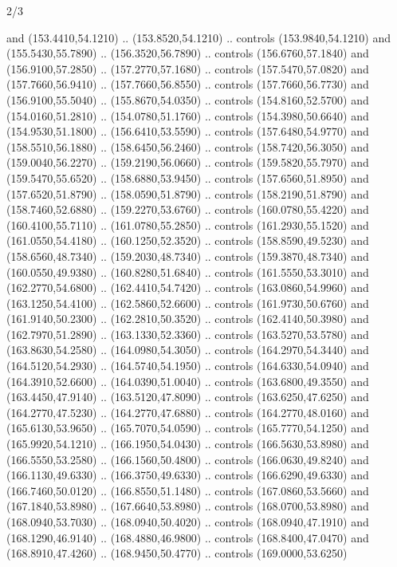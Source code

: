 \begin{flagdescription}{2/3}
\begin{scope}[xshift=0.5\flaglength,yshift=0.5\flagwidth,scale=\stretchfactor]
\begin{scope}[scale=0.001645\flagwidth,yshift=65mm,xshift=-63mm]
\begin{scope}[y=0.80pt, x=0.80pt, yscale=-1,]
\begin{scope}[cm={{1.33333,0.0,0.0,1.33333,(0.0,1e-05)}}]
  and (153.4410,54.1210) .. (153.8520,54.1210) .. controls (153.9840,54.1210)
  and (155.5430,55.7890) .. (156.3520,56.7890) .. controls (156.6760,57.1840)
  and (156.9100,57.2850) .. (157.2770,57.1680) .. controls (157.5470,57.0820)
  and (157.7660,56.9410) .. (157.7660,56.8550) .. controls (157.7660,56.7730)
  and (156.9100,55.5040) .. (155.8670,54.0350) .. controls (154.8160,52.5700)
  and (154.0160,51.2810) .. (154.0780,51.1760) .. controls (154.3980,50.6640)
  and (154.9530,51.1800) .. (156.6410,53.5590) .. controls (157.6480,54.9770)
  and (158.5510,56.1880) .. (158.6450,56.2460) .. controls (158.7420,56.3050)
  and (159.0040,56.2270) .. (159.2190,56.0660) .. controls (159.5820,55.7970)
  and (159.5470,55.6520) .. (158.6880,53.9450) .. controls (157.6560,51.8950)
  and (157.6520,51.8790) .. (158.0590,51.8790) .. controls (158.2190,51.8790)
  and (158.7460,52.6880) .. (159.2270,53.6760) .. controls (160.0780,55.4220)
  and (160.4100,55.7110) .. (161.0780,55.2850) .. controls (161.2930,55.1520)
  and (161.0550,54.4180) .. (160.1250,52.3520) .. controls (158.8590,49.5230)
  and (158.6560,48.7340) .. (159.2030,48.7340) .. controls (159.3870,48.7340)
  and (160.0550,49.9380) .. (160.8280,51.6840) .. controls (161.5550,53.3010)
  and (162.2770,54.6800) .. (162.4410,54.7420) .. controls (163.0860,54.9960)
  and (163.1250,54.4100) .. (162.5860,52.6600) .. controls (161.9730,50.6760)
  and (161.9140,50.2300) .. (162.2810,50.3520) .. controls (162.4140,50.3980)
  and (162.7970,51.2890) .. (163.1330,52.3360) .. controls (163.5270,53.5780)
  and (163.8630,54.2580) .. (164.0980,54.3050) .. controls (164.2970,54.3440)
  and (164.5120,54.2930) .. (164.5740,54.1950) .. controls (164.6330,54.0940)
  and (164.3910,52.6600) .. (164.0390,51.0040) .. controls (163.6800,49.3550)
  and (163.4450,47.9140) .. (163.5120,47.8090) .. controls (163.6250,47.6250)
  and (164.2770,47.5230) .. (164.2770,47.6880) .. controls (164.2770,48.0160)
  and (165.6130,53.9650) .. (165.7070,54.0590) .. controls (165.7770,54.1250)
  and (165.9920,54.1210) .. (166.1950,54.0430) .. controls (166.5630,53.8980)
  and (166.5550,53.2580) .. (166.1560,50.4800) .. controls (166.0630,49.8240)
  and (166.1130,49.6330) .. (166.3750,49.6330) .. controls (166.6290,49.6330)
  and (166.7460,50.0120) .. (166.8550,51.1480) .. controls (167.0860,53.5660)
  and (167.1840,53.8980) .. (167.6640,53.8980) .. controls (168.0700,53.8980)
  and (168.0940,53.7030) .. (168.0940,50.4020) .. controls (168.0940,47.1910)
  and (168.1290,46.9140) .. (168.4880,46.9800) .. controls (168.8400,47.0470)
  and (168.8910,47.4260) .. (168.9450,50.4770) .. controls (169.0000,53.6250)

\end{scope}
\end{scope}
\end{scope}
\end{scope}
\end{flagdescription}
